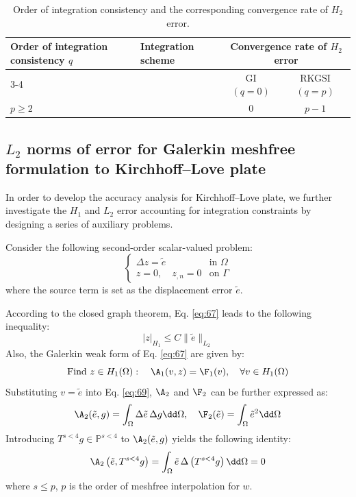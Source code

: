\begin{table}[pos=htbp]
\centering
\caption{Order of integration consistency and the corresponding convergence rate of $H_2$ error.}\label{tab:1}
\begin{tabular}{@{}llcc@{}}
\toprule
\multirow{2}{*}{Order of integration consistency $q$} & \multirow{2}{*}{Integration scheme} & \multicolumn{2}{c}{Convergence rate of $H_2$ error}\\
\cmidrule(lr){3-4}
& & GI $(q=0)$ & RKGSI $(q=p)$\\
\midrule
$p\ge2$ & & 0 & $p-1$\\
\bottomrule
\end{tabular}
\end{table}

\subsection{$L_2$ norms of error for Galerkin meshfree formulation to Kirchhoff--Love plate}\label{sec:l2}

In order to develop the accuracy analysis for Kirchhoff--Love plate, we further investigate the $H_1$ and $L_2$ error accounting for integration constraints by designing a series of auxiliary problems.

Consider the following second-order scalar-valued problem:
\begin{equation}\label{eq:67}
\begin{cases}
\Delta z=\tilde{e} & \text{in }\Omega\\[2pt]
z=0,\quad z_{,n}=0 & \text{on }\Gamma
\end{cases}
\end{equation}
where the source term is set as the displacement error $\tilde{e}$.

According to the closed graph theorem, Eq. \eqref{eq:67} leads to the following inequality:
\begin{equation}\label{eq:68}
|z|_{H_1}\le C\|\tilde{e}\|_{L_2}
\end{equation}
Also, the Galerkin weak form of Eq. \eqref{eq:67} are given by:
\begin{equation}\label{eq:69}
\text{Find }z\in H_1(\Omega):\quad \A_1(v,z)=\F_1(v),\quad \forall v\in H_1(\Omega)
\end{equation}
Substituting $v=\tilde{e}$ into Eq. \eqref{eq:69}, $\A_2$ and $\F_2$ can be further expressed as:
\begin{equation}\label{eq:70}
\A_2(\tilde{e},g)=\int_{\Omega}\Delta\tilde{e}\,\Delta g\dd\Omega,\quad
\F_2(\tilde{e})=\int_{\Omega}\tilde{e}^{2}\dd\Omega
\end{equation}
Introducing $T^{s<4}g\in\mathbb{P}^{s<4}$ to $\A_2(\tilde{e},g)$ yields the following identity:
\begin{equation}\label{eq:71}
\A_2\left(\tilde{e},T^{s<4}g\right)=\int_{\Omega}\tilde{e}\,\Delta\left(T^{s<4}g\right)\dd\Omega=0
\end{equation}
where $s\le p$, $p$ is the order of meshfree interpolation for $w$.

